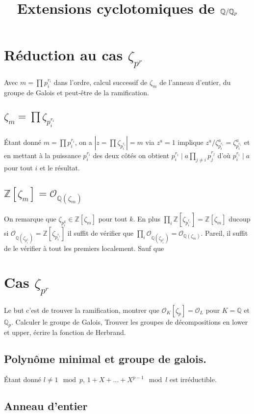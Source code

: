 \documentclass[a4paper,12pt]{book}
\title{Extensions cyclotomiques de $\Q/\Q_p$}
\date{}
\newcommand{\Z}{\mathbb{Z}}
\newcommand{\Q}{\mathbb{Q}}
\newcommand{\Or}{\mathcal{O}}
\theoremstyle{plain}
\theoremstyle{definition}
\theoremstyle{remark}
\begin{document}
\maketitle
\chapter{Réduction au cas $\zeta_{p^r}$}
Avec $m=\prod p_i^{r_i}$ dans l'ordre, calcul successif
de $\zeta_m$ de l'anneau d'entier, du groupe de Galois
et peut-être de la ramification.
\section{$\zeta_m=\prod\zeta_{p_i^{r_i}}$}
Étant donné $m=\prod p_i^{r_i}$, on a
$|z=\prod\zeta_{p_i^{r_i}}|=m$ via $z^a=1$
implique $z^a/\zeta_{p_i^{r_i}}^a=\zeta_{p_i^{r_i}}^a$
et en mettant à la puissance $p_i^{r_i}$ des deux 
côtés on obtient $p_i^{r_i}\mid a\prod_{j\ne i}p_j^{r_j}$
d'où $p_i^{r_i}\mid a$ pour tout $i$ et le résultat.
\section{$\Z[\zeta_m]=\Or_{\Q(\zeta_m)}$}
On remarque que $\zeta_{p_i^k}\in\Z[\zeta_m]$ pour
tout $k$. En plus $\prod_i\Z[\zeta_{p_i^{r_i}}]=\Z[\zeta_m]$
ducoup si $\Or_{\Q(\zeta_{p_i^{r_i}})}=\Z[\zeta_{p_i^{r_i}}]$
il suffit de vérifier que 
$\prod_i \Or_{\Q(\zeta_{p_i^{r_i}})}=\Or_{\Q(\zeta_m)}$. Pareil,
il suffit de le vérifier à tout les premiers localement. Sauf que


\chapter{Cas $\zeta_{p^r}$}
Le but c'est de trouver la ramification, montrer
que $\Or_K[\zeta_p]=\Or_L$ pour $K=\Q$ et $\Q_p$.
Calculer le groupe de Galois, Trouver les groupes
de décompositions en lower et upper, écrire la
fonction de Herbrand.

\section{Polynôme minimal et groupe de galois.}
Étant donné $l\ne 1\mod p$, $1+X+\ldots+X^{p-1}\mod l$ est
irréductible. 

\section{Anneau d'entier}
\end{document}
